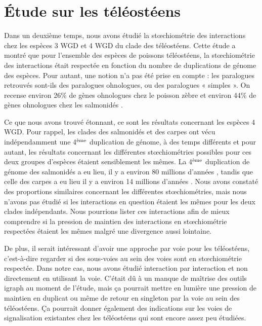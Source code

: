 \section{Étude sur les téléostéens}
\par Dans un deuxième temps, nous avons étudié la stœchiométrie des interactions chez les espèces 3 WGD et 4 WGD du clade des téléostéens. Cette étude a montré que pour l’ensemble des espèces de poissons téléostéens, la stœchiométrie des interactions était respectée en fonction du nombre de duplications de génome des espèces. Pour autant, une notion n’a pas été prise en compte : les paralogues retrouvés sont-ils des paralogues ohnologues, ou des paralogues « simples ». On recense environ 26\% de gènes ohnologues chez le poisson zèbre \parencite{howe_zebrafish_2013} et environ 44\% de gènes ohnologues chez les salmonidés \parencite{dimos_homology_2023}.
\par Ce que nous avons trouvé étonnant, ce sont les résultats concernant les espèces 4 WGD. Pour rappel, les clades des salmonidés et des carpes ont vécu indépendamment une 4$\textsuperscript{ème}$ duplication de génome, à des temps différents et pour autant, les résultats concernant les différentes stœchiométries possibles pour ces deux groupes d’espèces étaient sensiblement les mêmes. La 4$\textsuperscript{ème}$ duplication de génome des salmonidés a eu lieu, il y a environ 80 millions d’années \parencite{lien_atlantic_2016}, tandis que celle des carpes a eu lieu il y a environ 14 millions d’années \parencite{jaillon_genome_2004, kon_single-cell_2022, xu_allotetraploid_2019}. Nous avons constaté des proportions similaires concernant les différentes stœchiométries, mais nous n’avons pas étudié si les interactions en question étaient les mêmes pour les deux clades indépendants. Nous pourrions lister ces interactions afin de mieux comprendre si la pression de maintien des interactions en stœchiométrie respectées étaient les mêmes malgré une divergence aussi lointaine. 
\par De plus, il serait intéressant d’avoir une approche par voie pour les téléostéens, c’est-à-dire regarder si des sous-voies au sein des voies sont en stœchiométrie respectée. Dans notre cas, nous avons étudié interaction par interaction et non directement en utilisant la voie. C’était dû à un manque de maîtrise des outils igraph au moment de l’étude, mais ça pourrait mettre en lumière une pression de maintien en duplicat ou même de retour en singleton par la voie au sein des téléostéens. Ça pourrait donner également des indications sur les voies de signalisation existantes chez les téléostéens qui sont encore assez peu étudiées. 
